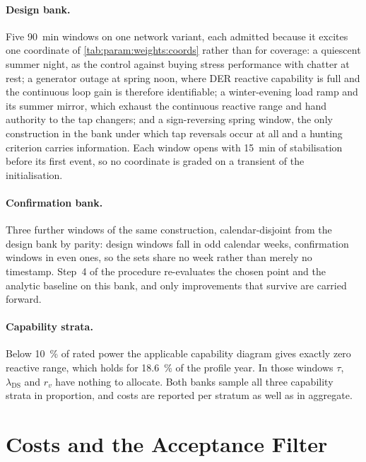 \paragraph{Design bank.}
\label{ch:app_wsel:bank}%
Five \qty{90}{\minute} windows on one network variant, each admitted because it excites one coordinate of \cref{tab:param:weights:coords} rather than for coverage: a quiescent summer night, as the control against buying stress performance with chatter at rest; a generator outage at spring noon, where \gls{DER} reactive capability is full and the continuous loop gain is therefore identifiable; a winter-evening load ramp and its summer mirror, which exhaust the continuous reactive range and hand authority to the tap changers; and a sign-reversing spring window, the only construction in the bank under which tap reversals occur at all and a hunting criterion carries information.
Each window opens with \qty{15}{\minute} of stabilisation before its first event, so no coordinate is graded on a transient of the initialisation.

\paragraph{Confirmation bank.}
Three further windows of the same construction, calendar-disjoint from the design bank by parity: design windows fall in odd calendar weeks, confirmation windows in even ones, so the sets share no week rather than merely no timestamp.
Step~4 of the procedure re-evaluates the chosen point and the analytic baseline on this bank, and only improvements that survive are carried forward.

\paragraph{Capability strata.}
Below \qty{10}{\percent} of rated power the applicable capability diagram \cite{VDARN4120.2018} gives exactly zero reactive range, which holds for \qty{18.6}{\percent} of the profile year.
In those windows $\tau$, $\lambda_{\mathrm{DS}}$ and $r_{v}$ have nothing to allocate.
Both banks sample all three capability strata in proportion, and costs are reported per stratum as well as in aggregate.

\section{Costs and the Acceptance Filter}\label{ch:app_bo:cost}
\label{ch:ofo:tuning:bo:cost}%
\label{ch:app_bo:cvar}%
\label{ch:ofo:tuning:bo:cvar}%
\label{ch:app_bo:cost_weights}%


